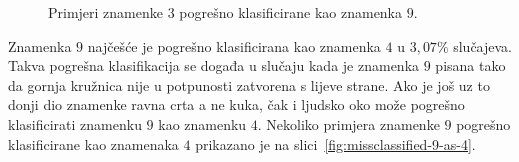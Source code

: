 \begin{figure}[htb]
    \centering
    \caption{Primjeri znamenke $3$ pogrešno klasificirane kao znamenka $9$.}
    \label{fig:missclassified-3-as-9}
\end{figure}
Znamenka $9$ najčešće je pogrešno klasificirana kao znamenka $4$ u $3{,}07\%$ slučajeva. Takva pogrešna klasifikacija se
događa u slučaju kada je znamenka $9$ pisana tako da gornja kružnica nije u potpunosti zatvorena s lijeve strane.
Ako je još uz to donji dio znamenke ravna crta a ne kuka, čak i ljudsko oko može pogrešno klasificirati znamenku $9$
kao znamenku $4$. Nekoliko primjera znamenke $9$ pogrešno klasificirane kao znamenaka $4$ prikazano je na
slici\ \ref{fig:missclassified-9-as-4}.
